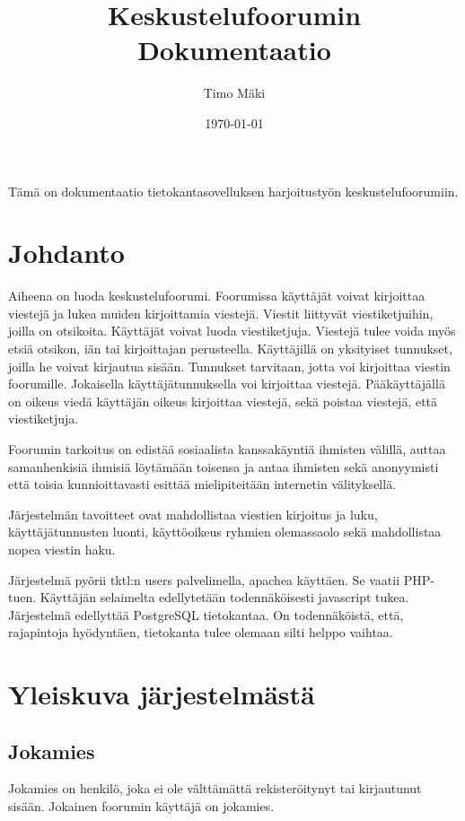 \documentclass[a4paper, 12pt, finnish]{article}
\title{Keskustelufoorumin Dokumentaatio}
\author{Timo Mäki}
\date{\today}
\begin{document}
 \maketitle

Tämä on dokumentaatio tietokantasovelluksen harjoitustyön keskustelufoorumiin.

\newpage\null\thispagestyle{empty}\newpage
\tableofcontents
\newpage\null\thispagestyle{empty}\newpage
\section{Johdanto}

Aiheena on luoda keskustelufoorumi.
Foorumissa käyttäjät voivat kirjoittaa viestejä ja lukea muiden kirjoittamia viestejä.
Viestit liittyvät viestiketjuihin, joilla on otsikoita.
Käyttäjät voivat luoda viestiketjuja.
Viestejä tulee voida myös etsiä otsikon, iän tai kirjoittajan perusteella. Käyttäjillä on yksityiset tunnukset, joilla he voivat kirjautua sisään.
Tunnukset tarvitaan, jotta voi kirjoittaa viestin foorumille.
Jokaisella käyttäjätunnuksella voi kirjoittaa viestejä.
Pääkäyttäjällä on oikeus viedä käyttäjän oikeus kirjoittaa viestejä, sekä poistaa viestejä, että viestiketjuja.
\indent

Foorumin tarkoitus on edistää sosiaalista kanssakäyntiä ihmisten välillä, auttaa samanhenkisiä ihmisiä löytämään toisensa ja antaa ihmisten sekä anonyymisti että toisia kunnioittavasti esittää mielipiteitään internetin välityksellä.
\indent

Järjestelmän tavoitteet ovat mahdollistaa viestien kirjoitus ja luku, käyttäjätunnusten luonti, käyttöoikeus ryhmien olemassaolo sekä mahdollistaa nopea viestin haku.
\indent

Järjestelmä pyörii tktl:n users palvelimella, apachea käyttäen.
Se vaatii PHP-tuen.
Käyttäjän selaimelta edellytetään todennäköisesti javascript tukea.
Järjestelmä edellyttää PostgreSQL tietokantaa.
On todennäköistä, että, rajapintoja hyödyntäen, tietokanta tulee olemaan silti helppo vaihtaa.

\newpage
\section{Yleiskuva järjestelmästä}
\subsection{Jokamies}
Jokamies on henkilö, joka ei ole välttämättä rekisteröitynyt tai kirjautunut sisään.
Jokainen foorumin käyttäjä on jokamies.
\end{document}
